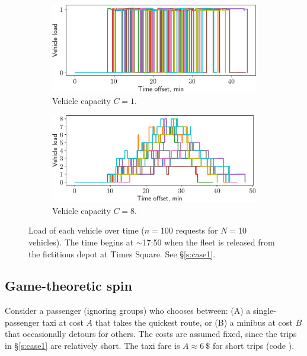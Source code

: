 \documentclass[12pt,notitlepage]{article}
\begin{document}
\begin{figure}[!p]
	\begin{subfigure}{0.5\textwidth}
		\includegraphics[width=\textwidth]{20210616-OPT1/c_grid_study0/UTC-20210619-074952/plots/8/vehicle_load}
		\caption{Vehicle capacity $C = 1$.}
	\end{subfigure}
	\begin{subfigure}{0.5\textwidth}
		\includegraphics[width=\textwidth]{20210616-OPT1/c_grid_study0/UTC-20210619-074952/plots/9/vehicle_load}
		
		\caption{Vehicle capacity $C = 8$.}
	\end{subfigure}
	
	\caption{%
		Load of each vehicle over time
		($n = 100$ requests for $N = 10$ vehicles).
		The time begins at $\sim$17:50 
		when the fleet is released 
		from the fictitious depot
		at Times Square.
		See \S\ref{s:case1}.
	}
	\label{f:case1-load}
\end{figure}




\subsection{Game-theoretic spin} \label{s:game1}

Consider a passenger
(ignoring groups)
who chooses between: 
(A) a single-passenger taxi at cost $A$ that takes the quickest route,
or
(B) a minibus at cost $B$ that occasionally detours for others.
%
%
%
%
%
The costs are assumed fixed,
since the trips in \S\ref{s:case1} are relatively short.
%
%
The taxi fare is $A \approx \SI{6}{\$}$ for short trips 
(code ).
\end{document}
